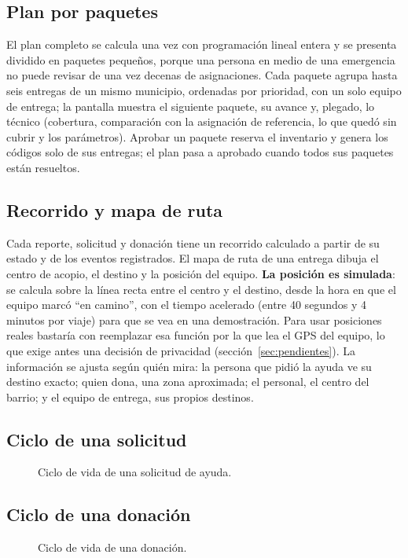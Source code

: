 \subsection{Plan por paquetes}
El plan completo se calcula una vez con programación lineal entera y se presenta dividido en paquetes pequeños, porque una persona en medio de una emergencia no puede revisar de una vez decenas de asignaciones. Cada paquete agrupa hasta seis entregas de un mismo municipio, ordenadas por prioridad, con un solo equipo de entrega; la pantalla muestra el siguiente paquete, su avance y, plegado, lo técnico (cobertura, comparación con la asignación de referencia, lo que quedó sin cubrir y los parámetros). Aprobar un paquete reserva el inventario y genera los códigos solo de sus entregas; el plan pasa a aprobado cuando todos sus paquetes están resueltos.

\subsection{Recorrido y mapa de ruta}
Cada reporte, solicitud y donación tiene un recorrido calculado a partir de su estado y de los eventos registrados. El mapa de ruta de una entrega dibuja el centro de acopio, el destino y la posición del equipo. \textbf{La posición es simulada}: se calcula sobre la línea recta entre el centro y el destino, desde la hora en que el equipo marcó ``en camino'', con el tiempo acelerado (entre 40 segundos y 4 minutos por viaje) para que se vea en una demostración. Para usar posiciones reales bastaría con reemplazar esa función por la que lea el GPS del equipo, lo que exige antes una decisión de privacidad (sección~\ref{sec:pendientes}). La información se ajusta según quién mira: la persona que pidió la ayuda ve su destino exacto; quien dona, una zona aproximada; el personal, el centro del barrio; y el equipo de entrega, sus propios destinos.

\subsection{Ciclo de una solicitud}
\begin{figure}[H]
\centering

\caption{Ciclo de vida de una solicitud de ayuda.}
\label{fig:ciclo}
\end{figure}

\subsection{Ciclo de una donación}
\begin{figure}[H]
\centering

\caption{Ciclo de vida de una donación.}
\label{fig:donacion}
\end{figure}

